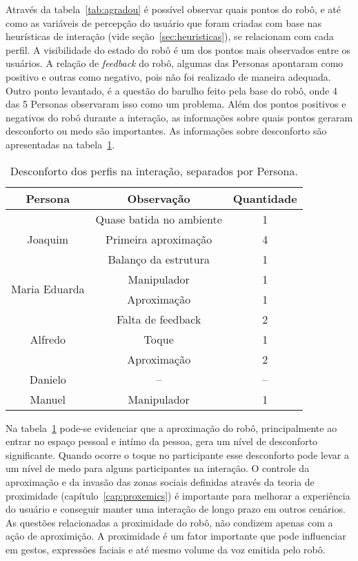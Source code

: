 Através da tabela~\ref{tab:agradou} é possível observar quais pontos do robô, e até como as variáveis de percepção do usuário que foram criadas com base nas heurísticas de interação (vide seção~\ref{sec:heuristicas}), se relacionam com cada perfil. A visibilidade do estado do robô é um dos pontos mais observados entre os usuários. A relação de \emph{feedback} do robô, algumas das Personas apontaram como positivo e outras como negativo, pois não foi realizado de maneira adequada. Outro ponto levantado, é a questão do barulho feito pela base do robô, onde 4 das 5 Personas observaram isso como um problema. Além dos pontos positivos e negativos do robô durante a interação, as informações sobre quais pontos geraram desconforto ou medo são importantes. As informações sobre desconforto são apresentadas na tabela~\ref{tab:desconforto}.

\begin{table}[!ht]
	\caption{Desconforto dos perfis na interação, separados por Persona.}
	\label{tab:desconforto}
	\centering
	\begin{tabular}{c | c | c }
        \hline
        Persona & Observação & Quantidade \\
        \hline
        \multirow{3}{*}{Joaquim} & Quase batida no ambiente & 1 \\
        \hhline{~--}
        & Primeira aproximação & 4 \\
        \hhline{~--}
        & Balanço da estrutura & 1 \\
        \hline
        \multirow{2}{*}{Maria Eduarda} & Manipulador & 1 \\
        \hhline{~--}
        & Aproximação & 1 \\
        \hline
        \multirow{3}{*}{Alfredo} & Falta de feedback & 2 \\
        \hhline{~--}
        & Toque & 1 \\
        \hhline{~--}
        & Aproximação & 2 \\
        \hline
        Danielo & -- & -- \\
        \hline
        Manuel & Manipulador & 1 \\
        \hline
    \end{tabular}
\end{table}

Na tabela~\ref{tab:desconforto} pode-se evidenciar que a aproximação do robô, principalmente ao entrar no espaço pessoal e intímo da pessoa, gera um nível de desconforto significante. Quando ocorre o toque no participante esse desconforto pode levar a um nível de medo para alguns participantes na interação. O controle da aproximação e da invasão das zonas sociais definidas através da teoria de proximidade (capítulo~\ref{cap:proxemics}) é importante para melhorar a experiência do usuário e conseguir manter uma interação de longo prazo em outros cenários. As questões relacionadas a proximidade do robô, não condizem apenas com a ação de aproximição. A proximidade é um fator importante que pode influenciar em gestos, expressões faciais e até mesmo volume da voz emitida pelo robô.

